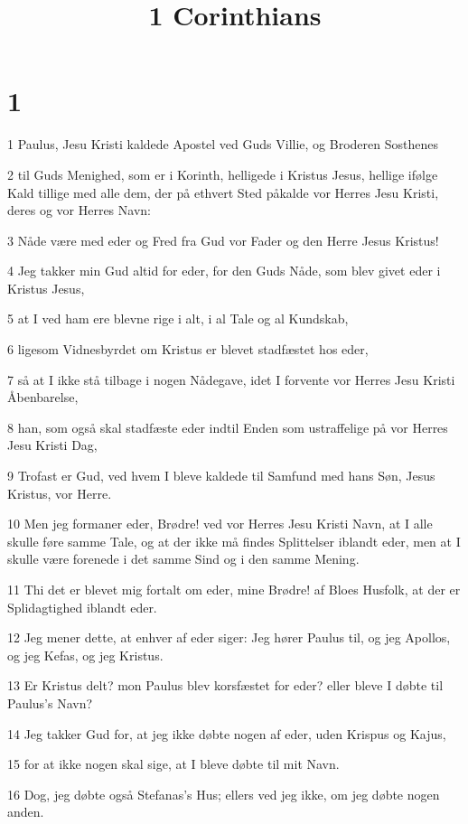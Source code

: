 

\title{1 Corinthians}


\chapter{1}

\par 1 Paulus, Jesu Kristi kaldede Apostel ved Guds Villie, og Broderen Sosthenes
\par 2 til Guds Menighed, som er i Korinth, helligede i Kristus Jesus, hellige ifølge Kald tillige med alle dem, der på ethvert Sted påkalde vor Herres Jesu Kristi, deres og vor Herres Navn:
\par 3 Nåde være med eder og Fred fra Gud vor Fader og den Herre Jesus Kristus!
\par 4 Jeg takker min Gud altid for eder, for den Guds Nåde, som blev givet eder i Kristus Jesus,
\par 5 at I ved ham ere blevne rige i alt, i al Tale og al Kundskab,
\par 6 ligesom Vidnesbyrdet om Kristus er blevet stadfæstet hos eder,
\par 7 så at I ikke stå tilbage i nogen Nådegave, idet I forvente vor Herres Jesu Kristi Åbenbarelse,
\par 8 han, som også skal stadfæste eder indtil Enden som ustraffelige på vor Herres Jesu Kristi Dag,
\par 9 Trofast er Gud, ved hvem I bleve kaldede til Samfund med hans Søn, Jesus Kristus, vor Herre.
\par 10 Men jeg formaner eder, Brødre! ved vor Herres Jesu Kristi Navn, at I alle skulle føre samme Tale, og at der ikke må findes Splittelser iblandt eder, men at I skulle være forenede i det samme Sind og i den samme Mening.
\par 11 Thi det er blevet mig fortalt om eder, mine Brødre! af Bloes Husfolk, at der er Splidagtighed iblandt eder.
\par 12 Jeg mener dette, at enhver af eder siger: Jeg hører Paulus til, og jeg Apollos, og jeg Kefas, og jeg Kristus.
\par 13 Er Kristus delt? mon Paulus blev korsfæstet for eder? eller bleve I døbte til Paulus's Navn?
\par 14 Jeg takker Gud for, at jeg ikke døbte nogen af eder, uden Krispus og Kajus,
\par 15 for at ikke nogen skal sige, at I bleve døbte til mit Navn.
\par 16 Dog, jeg døbte også Stefanas's Hus; ellers ved jeg ikke, om jeg døbte nogen anden.
